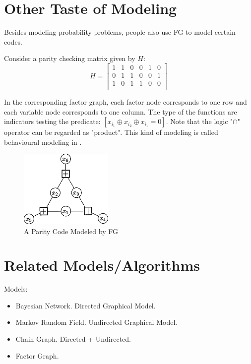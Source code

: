 \documentclass[11pt,a4paper]{article}
\begin{document}
\section{Other Taste of Modeling}

Besides modeling probability problems, people also use FG to 
model certain codes. 

Consider a parity checking matrix given by $H$:
\begin{equation}
	H = \left[
	\begin{matrix}
		1 & 1 & 0 & 0 & 1 & 0 \\
0 & 1 & 1 & 0 & 0 & 1 \\
1 & 0 & 1 & 1 & 0 & 0 \\
	\end{matrix}
	\right]
\end{equation}

In the corresponding factor graph, each factor node corresponds
to one row and each variable node corresponds to one column. The 
type of the functions are indicators testing the predicate:
$[x_{i_1} \oplus x_{i_2} \oplus x_{i_1} = 0]$. Note that 
the logic "$\cap$" operator can be regarded as "product". 
This kind of modeling is called behavioural modeling in 
\cite{kschischang2001factor}. 

\begin{figure}[htb]
\centering
	\includegraphics[width=0.4\textwidth]{fig/kschischang2001-parity}
	\caption{A Parity Code Modeled by FG\cite{kschischang2001factor}}
\end{figure}




\section{Related Models/Algorithms}

Models:
\begin{itemize}
	\item Bayesian Network. Directed Graphical Model. 
	\item Markov Random Field. Undirected Graphical Model.
	\item Chain Graph. Directed + Undirected.  
	\item Factor Graph. 
\end{itemize}
\end{document}
